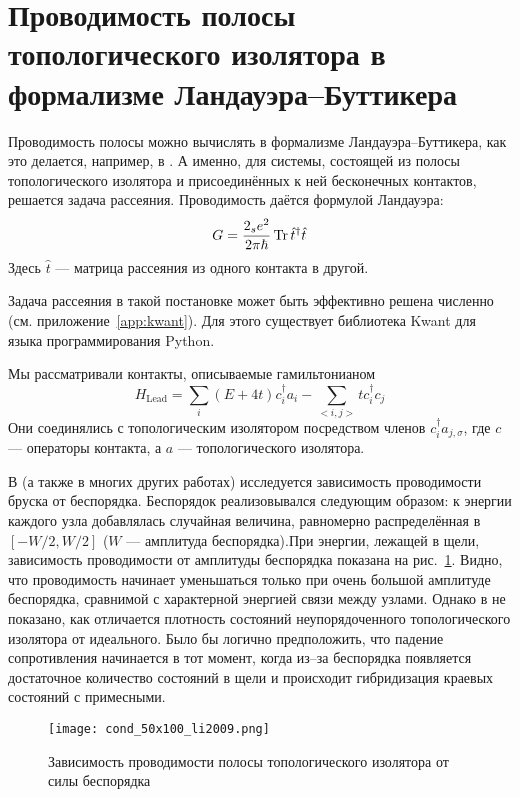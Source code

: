 \section{Проводимость полосы топологического изолятора
         в формализме Ландауэра--Буттикера}
Проводимость полосы можно вычислять в формализме Ландауэра--Буттикера, как
это делается, например, в \cite{Li2009}. А именно, для системы, состоящей
из полосы топологического изолятора и присоединённых к ней бесконечных
контактов, решается задача рассеяния. Проводимость даётся формулой
Ландауэра:
\begin{equation}
    G = \frac{2_se^2}{2\pi \hbar} \operatorname{Tr}{\hat{t}^\dagger \hat{t}}
\end{equation}
Здесь $\hat{t}$ --- матрица рассеяния из одного контакта в другой. 

Задача рассеяния в такой постановке может быть эффективно решена численно
(см. приложение~\ref{app:kwant}). Для этого существует библиотека Kwant 
\cite{Groth2014} для языка программирования Python.

Мы рассматривали контакты, описываемые гамильтонианом
\begin{equation}
    H_{\mathrm{Lead}} = \sum_i (E + 4t)c_{i}^\dagger a_{i} - \sum_{<i,j>} t c_{i}^\dagger c_{j}
\end{equation}
Они соединялись с топологическим изолятором посредством членов $c_i^\dagger a_{j,\sigma}$, 
где $c$ --- операторы контакта, а $a$ --- топологического изолятора.

В \cite{Li2009} (а также в многих других работах) исследуется зависимость проводимости 
бруска от беспорядка. Беспорядок реализовывался следующим образом:
к энергии каждого узла добавлялась случайная величина, равномерно распределённая в 
$[-W/2, W/2]$ ($W$ --- амплитуда беспорядка).При энергии, лежащей в щели, зависимость 
проводимости от амплитуды
беспорядка показана на рис.~\ref{fig:cond_vs_disorder}. Видно, что проводимость начинает 
уменьшаться только при очень большой амплитуде беспорядка,
сравнимой с характерной энергией связи между узлами. Однако в \cite{Li2009} не показано,
как отличается плотность состояний неупорядоченного топологического изолятора от идеального. 
Было бы логично предположить, что падение сопротивления начинается в тот момент, когда
из--за беспорядка появляется достаточное количество состояний в щели и происходит гибридизация
краевых состояний с примесными.

\begin{figure}[h]
    \centering
    \texttt{[image: cond\_50x100\_li2009.png]}
    \caption{Зависимость проводимости полосы топологического изолятора от силы беспорядка}
    \label{fig:cond_vs_disorder}
\end{figure}


